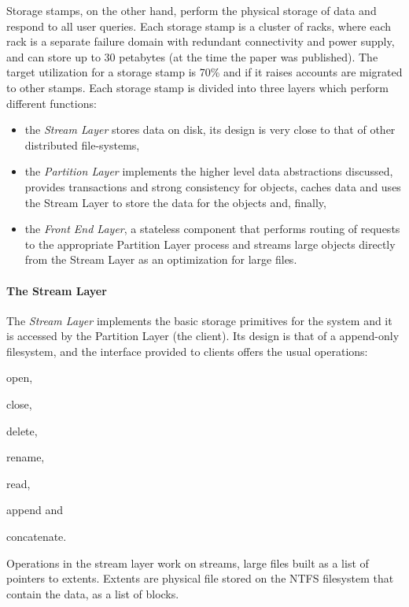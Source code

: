 Storage stamps, on the other hand, perform the physical storage of data and respond to all user queries.
Each storage stamp is a cluster of racks, where each rack is a separate failure domain with redundant connectivity and power supply, and can store up to 30 petabytes (at the time the paper was published).
The target utilization for a storage stamp is 70\% and if it raises accounts are migrated to other stamps.
Each storage stamp is divided into three layers which perform different functions:
\begin{itemize}
    \item the \emph{Stream Layer} stores data on disk, its design is very close to that of other distributed file-systems,
    \item the \emph{Partition Layer} implements the higher level data abstractions discussed, provides transactions and strong consistency for objects, caches data and uses the Stream Layer to store the data for the objects and, finally,
    \item the \emph{Front End Layer}, a stateless component that performs routing of requests to the appropriate Partition Layer process and streams large objects directly from the Stream Layer as an optimization for large files.
\end{itemize}

\paragraph{The Stream Layer}

The \emph{Stream Layer} implements the basic storage primitives for the system and it is accessed by the Partition Layer (the client).
Its design is that of a append-only filesystem, and the interface provided to clients offers the usual operations:
\begin{inparaenum}[i)]
    \item open,
    \item close,
    \item delete,
    \item rename,
    \item read,
    \item append and
    \item concatenate.
\end{inparaenum}
Operations in the stream layer work on streams, large files built as a list of pointers to extents.
Extents are physical file stored on the NTFS filesystem that contain the data, as a list of blocks.

